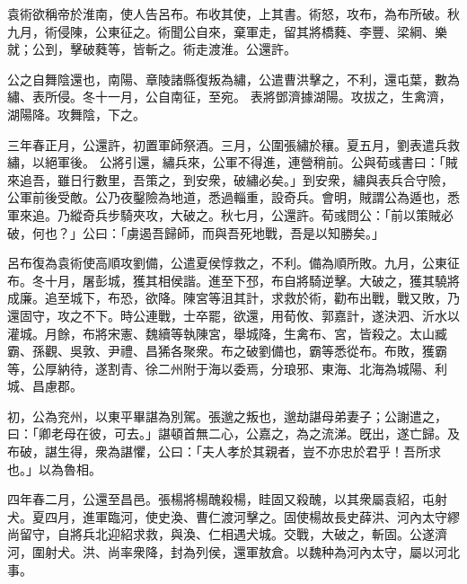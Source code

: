 \begin{pinyinscope}
袁術欲稱帝於淮南，使人告呂布。布收其使，上其書。術怒，攻布，為布所破。秋九月，術侵陳，公東征之。術聞公自來，棄軍走，留其將橋蕤、李豐、梁綱、樂就；公到，擊破蕤等，皆斬之。術走渡淮。公還許。


公之自舞陰還也，南陽、章陵諸縣復叛為繡，公遣曹洪擊之，不利，還屯葉，數為繡、表所侵。冬十一月，公自南征，至宛。
表將鄧濟據湖陽。攻拔之，生禽濟，湖陽降。攻舞陰，下之。


三年春正月，公還許，初置軍師祭酒。三月，公圍張繡於穰。夏五月，劉表遣兵救繡，以絕軍後。
公將引還，繡兵來，公軍不得進，連營稍前。公與荀彧書曰：「賊來追吾，雖日行數里，吾策之，到安衆，破繡必矣。」到安衆，繡與表兵合守險，公軍前後受敵。公乃夜鑿險為地道，悉過輜重，設奇兵。會明，賊謂公為遁也，悉軍來追。乃縱奇兵步騎夾攻，大破之。秋七月，公還許。荀彧問公：「前以策賊必破，何也？」公曰：「虜遏吾歸師，而與吾死地戰，吾是以知勝矣。」


呂布復為袁術使高順攻劉備，公遣夏侯惇救之，不利。備為順所敗。九月，公東征布。冬十月，屠彭城，獲其相侯諧。進至下邳，布自將騎逆擊。大破之，獲其驍將成廉。追至城下，布恐，欲降。陳宮等沮其計，求救於術，勸布出戰，戰又敗，乃還固守，攻之不下。時公連戰，士卒罷，欲還，用荀攸、郭嘉計，遂決泗、沂水以灌城。月餘，布將宋憲、魏續等執陳宮，舉城降，生禽布、宮，皆殺之。太山臧霸、孫觀、吳敦、尹禮、昌狶各聚衆。布之破劉備也，霸等悉從布。布敗，獲霸等，公厚納待，遂割青、徐二州附于海以委焉，分琅邪、東海、北海為城陽、利城、昌慮郡。


初，公為兖州，以東平畢諶為別駕。張邈之叛也，邈劫諶母弟妻子；公謝遣之，曰：「卿老母在彼，可去。」諶頓首無二心，公嘉之，為之流涕。旣出，遂亡歸。及布破，諶生得，衆為諶懼，公曰：「夫人孝於其親者，豈不亦忠於君乎！吾所求也。」以為魯相。


四年春二月，公還至昌邑。張楊將楊醜殺楊，眭固又殺醜，以其衆屬袁紹，屯射犬。夏四月，進軍臨河，使史渙、曹仁渡河擊之。固使楊故長史薛洪、河內太守繆尚留守，自將兵北迎紹求救，與渙、仁相遇犬城。交戰，大破之，斬固。公遂濟河，圍射犬。洪、尚率衆降，封為列侯，還軍敖倉。以魏种為河內太守，屬以河北事。



\end{pinyinscope}
